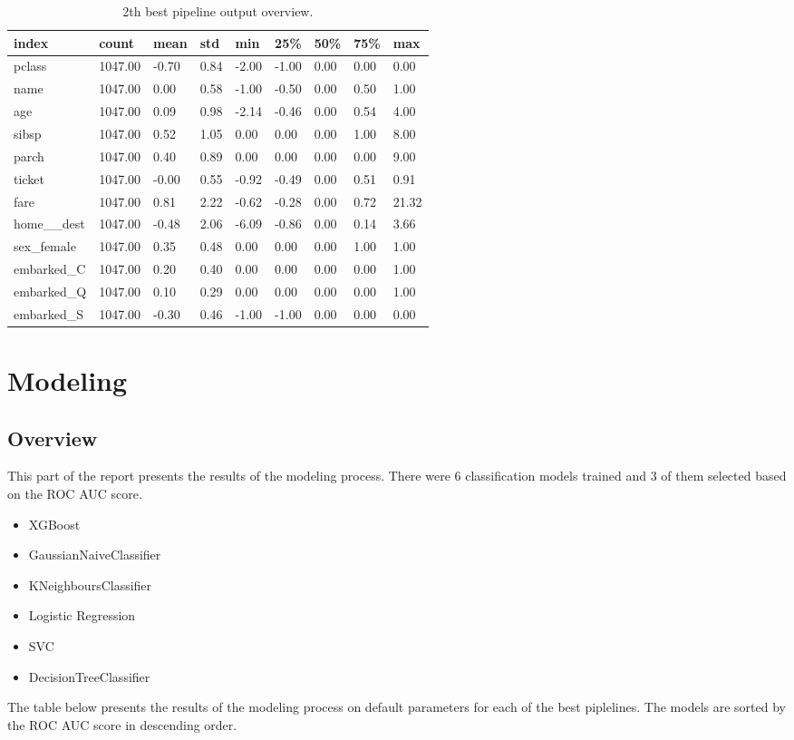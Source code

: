 \documentclass{article}%
\begin{document}
%


\begin{table}[H]%
\begin{center}%
\begin{tabular}{l l l l l l l l l}%
\hline%
\textbf{index}&\textbf{count}&\textbf{mean}&\textbf{std}&\textbf{min}&\textbf{25\%}&\textbf{50\%}&\textbf{75\%}&\textbf{max}\\%
\hline%
pclass&1047.00&{-}0.70&0.84&{-}2.00&{-}1.00&0.00&0.00&0.00\\%
name&1047.00&0.00&0.58&{-}1.00&{-}0.50&0.00&0.50&1.00\\%
age&1047.00&0.09&0.98&{-}2.14&{-}0.46&0.00&0.54&4.00\\%
sibsp&1047.00&0.52&1.05&0.00&0.00&0.00&1.00&8.00\\%
parch&1047.00&0.40&0.89&0.00&0.00&0.00&0.00&9.00\\%
ticket&1047.00&{-}0.00&0.55&{-}0.92&{-}0.49&0.00&0.51&0.91\\%
fare&1047.00&0.81&2.22&{-}0.62&{-}0.28&0.00&0.72&21.32\\%
home\_\_dest&1047.00&{-}0.48&2.06&{-}6.09&{-}0.86&0.00&0.14&3.66\\%
sex\_female&1047.00&0.35&0.48&0.00&0.00&0.00&1.00&1.00\\%
embarked\_C&1047.00&0.20&0.40&0.00&0.00&0.00&0.00&1.00\\%
embarked\_Q&1047.00&0.10&0.29&0.00&0.00&0.00&0.00&1.00\\%
embarked\_S&1047.00&{-}0.30&0.46&{-}1.00&{-}1.00&0.00&0.00&0.00\\%
\hline%
\end{tabular}%
\end{center}%
\caption{2th best pipeline output overview.}%
\end{table}

%
\section{Modeling}%
\label{sec:Modeling}%

%
\subsection{Overview}%
\label{subsec:Overview}%

%
This part of the report presents the results of the modeling process. There were 6 classification models trained and 3 of them selected based on the ROC AUC score.%
\newline%
%
\newline%
\begin{itemize}%
\item%
XGBoost%
\item%
GaussianNaiveClassifier%
\item%
KNeighboursClassifier%
\item%
Logistic Regression%
\item%
SVC%
\item%
DecisionTreeClassifier%
\end{itemize}%
The table below presents the results of the modeling process on default parameters for each of the best piplelines. The models are sorted by the ROC AUC score in descending order.%
\end{document}
